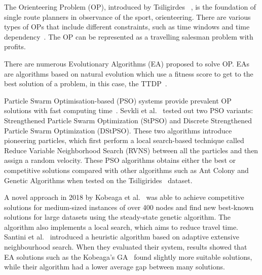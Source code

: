 The Orienteering Problem (OP), introduced by Tsiligirdes
~\cite{Tsiligirides1984}, is the foundation of
single route planners in observance of the sport, orienteering. There are
various types of OPs that include different constraints, such as time windows
and time dependency~\cite{Gunawan2016}. The OP can be represented as a
travelling salesman problem with profits. 

%

There are numerous Evolutionary Algorithms (EA) proposed to solve OP.
EAs are algorithms based on natural evolution which
use a fitness score to get to the best solution of a problem, in this case, the
TTDP~\cite{Gunawan2016}.



Particle Swarm Optimisation-based (PSO) systems provide prevalent OP solutions
with fast computing time~\cite{Yu2019}.  Sevkli
et al.~\cite{Sevkli2010,Sevkli2010a} tested out two PSO variants:
Strengthened Particle Swarm Optimization (StPSO) and Discrete Strengthened
Particle Swarm Optimization (DStPSO). These two algorithms introduce pioneering
particles, which first perform a local search-based technique called Reduce
Variable Neighborhood Search (RVNS) between all the particles and then assign a
random velocity. These PSO algorithms obtains either the best or competitive
solutions compared with other algorithms such as Ant Colony and Genetic
Algorithms when tested on the Tsiligirides~\cite{Tsiligirides1984, Chen2011a}
dataset.

A novel approach in 2018  by Kobeaga et al.~\cite{Kobeaga2018} was able to
achieve competitive solutions for medium-sized instances of over 400 nodes and
find new best-known solutions for large datasets using the steady-state genetic
algorithm. The algorithm also implements a local search, which aims to reduce
travel time. Santini et al.~\cite{Santini2019} introduced a heuristic algorithm
based on adaptive extensive neighbourhood search. When they evaluated their
system, results showed that EA solutions such as the Kobeaga's GA~\cite{Kobeaga2018} found slightly more suitable
solutions, while their algorithm had a lower average gap between many
solutions.

